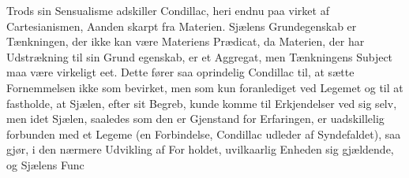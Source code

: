 \documentclass[12pt,a4paper]{book}
\begin{document}
Trods sin Sensualisme adskiller Condillac, heri endnu paa\-%
virket af Cartesianismen, Aanden skarpt fra Materien. Sjælens
Grundegenskab er Tænkningen, der ikke kan være Materiens
Prædicat, da Materien, der har Udstrækning til sin Grund\-%
egenskab, er et Aggregat, men Tænkningens Subject maa være
virkeligt eet. Dette fører saa oprindelig Condillac til, at sætte
Fornemmelsen ikke som bevirket, men som kun foranlediget
ved Legemet og til at fastholde, at Sjælen, efter sit Begreb,
kunde komme til Erkjendelser ved sig selv, men idet Sjælen,
saaledes som den er Gjenstand for Erfaringen, er uadskillelig
forbunden med et Legeme (en Forbindelse, Condillac udleder
af Syndefaldet), saa gjør, i den nærmere Udvikling af For\-%
holdet, uvilkaarlig Enheden sig gjældende, og Sjælens Func\-%
%
%
\end{document}
